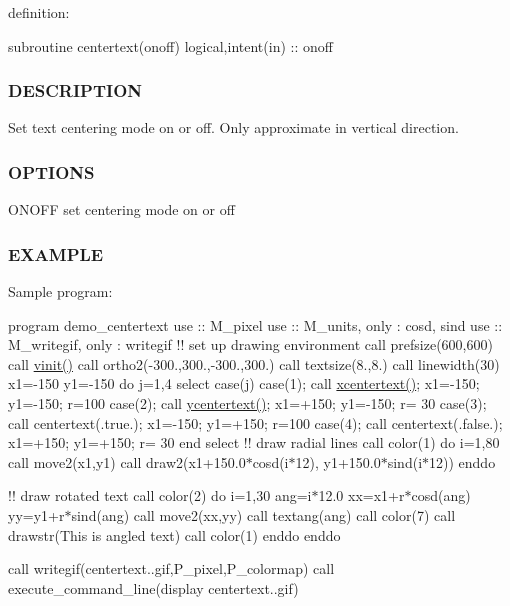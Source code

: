 definition\+:

subroutine centertext(onoff) logical,intent(in) \+:\+: onoff

\subsubsection*{D\+E\+S\+C\+R\+I\+P\+T\+I\+ON}

Set text centering mode on or off. Only approximate in vertical direction.

\subsubsection*{O\+P\+T\+I\+O\+NS}

O\+N\+O\+FF set centering mode on or off

\subsubsection*{E\+X\+A\+M\+P\+LE}

Sample program\+:

program demo\+\_\+centertext use \+:\+: M\+\_\+pixel use \+:\+: M\+\_\+units, only \+: cosd, sind use \+:\+: M\+\_\+writegif, only \+: writegif !! set up drawing environment call prefsize(600,600) call \hyperlink{namespacem__pixel_ac03ca8f23fdadb60599b6ea4dc87a6d9}{vinit()} call ortho2(-\/300.,300.,-\/300.,300.) call textsize(8.,8.) call linewidth(30) x1=-\/150 y1=-\/150 do j=1,4 select case(j) case(1); call \hyperlink{namespacem__pixel_a1e0c43d36b35eafea921f91c31d8a478}{xcentertext()}; x1=-\/150; y1=-\/150; r=100 case(2); call \hyperlink{namespacem__pixel_a2e32105b5e77abf38768fec6b11376a3}{ycentertext()}; x1=+150; y1=-\/150; r= 30 case(3); call centertext(.true.); x1=-\/150; y1=+150; r=100 case(4); call centertext(.false.); x1=+150; y1=+150; r= 30 end select !! draw radial lines call color(1) do i=1,80 call move2(x1,y1) call draw2(x1+150.0$\ast$cosd(i$\ast$12), y1+150.0$\ast$sind(i$\ast$12)) enddo

!! draw rotated text call color(2) do i=1,30 ang=i$\ast$12.0 xx=x1+r$\ast$cosd(ang) yy=y1+r$\ast$sind(ang) call move2(xx,yy) call textang(ang) call color(7) call drawstr(\textquotesingle{}This is angled text\textquotesingle{}) call color(1) enddo enddo

call writegif(\textquotesingle{}centertext..\+gif\textquotesingle{},P\+\_\+pixel,P\+\_\+colormap) call execute\+\_\+command\+\_\+line(\textquotesingle{}display centertext..\+gif\textquotesingle{})

